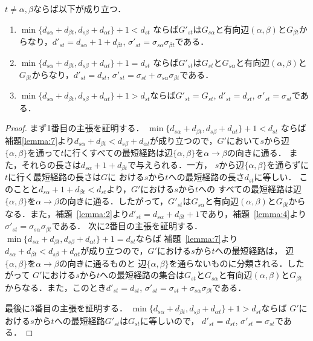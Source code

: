 \begin{lemma}
$t \neq \alpha, \beta$ならば以下が成り立つ．
\begin{enumerate}
\item $\min\{d_{s\alpha}+d_{\beta t}, d_{s\beta}+d_{\alpha t}\}+1<d_{st}$
ならば$G'_{st}$は$G_{s\alpha}$と有向辺$(\alpha,\beta)$と$G_{\beta t}$からなり，$d'_{st}=d_{s\alpha}+1+d_{\beta t}$, $\sigma'_{st}=\sigma_{s\alpha}\sigma_{\beta t}$である．
\item $\min\{d_{s\alpha}+d_{\beta t}, d_{s\beta}+d_{\alpha t}\}+1=d_{st}$
ならば$G'_{st}$は$G_{st}$と$G_{s\alpha}$と有向辺$(\alpha,\beta)$と$G_{\beta t}$からなり，$d'_{st}=d_{st}$, $\sigma'_{st}=\sigma_{st}+\sigma_{s\alpha}\sigma_{\beta t}$である．
\item $\min\{d_{s\alpha}+d_{\beta t}, d_{s\beta}+d_{\alpha t}\}+1>d_{st}$ならば$G'_{st}=G_{st}$, $d'_{st}=d_{st}$, $\sigma'_{st}=\sigma_{st}$である．
\end{enumerate}
\label{lemma:8}
\end{lemma}
\begin{proof}
まず1番目の主張を証明する．
$\min\{d_{s\alpha}+d_{\beta t}, d_{s\beta}+d_{\alpha t}\}+1<d_{st}$
ならば補題\ref{lemma:7}より$d_{s\alpha}+d_{\beta t}<d_{s\beta}+d_{\alpha t}$が成り立つので，$G'$において$s$から辺$\{\alpha,\beta\}$を通って$t$に行くすべての最短経路は辺$\{\alpha,\beta\}$を$\alpha \rightarrow \beta$の向きに通る．
また，それらの長さは$d_{s\alpha}+1+d_{\beta t}$で与えられる．一方，
$s$から辺$\{\alpha,\beta\}$を通らずに$t$に行く最短経路の長さは$G$に
おける$s$から$t$への最短経路の長さ$d_{st}$に等しい．
このことと$d_{s\alpha}+1+d_{\beta t}<d_{st}$より，$G'$における$s$から$t$への
すべての最短経路は辺$\{\alpha,\beta\}$を$\alpha \rightarrow \beta$の向きに通る．したがって，$G'_{st}$は$G_{s\alpha}$と有向辺$(\alpha,\beta)$と$G_{\beta t}$からなる．また，補題~\ref{lemma:2}より$d'_{st}=d_{s\alpha}+d_{\beta t}+1$であり，補題~\ref{lemma:4}より$\sigma'_{st}=\sigma_{s\alpha}\sigma_{\beta t}$である．
%
次に2番目の主張を証明する．
$\min\{d_{s\alpha}+d_{\beta t}, d_{s\beta}+d_{\alpha t}\}+1=d_{st}$ならば
補題~\ref{lemma:7}より$d_{s\alpha}+d_{\beta t}<d_{s\beta}+d_{\alpha t}$が成り立つので，$G'$における$s$から$t$への最短経路は，
辺$\{\alpha,\beta\}$を$\alpha \rightarrow \beta$の向きに通るものと
辺$\{\alpha,\beta\}$を通らないものに分類される．したがって
$G'$における$s$から$t$への最短経路の集合は$G_{st}$と$G_{s\alpha}$と有向辺$(\alpha,\beta)$と$G_{\beta t}$からなる．また，このとき$d'_{st}=d_{st}$, $\sigma'_{st}=\sigma_{st}+\sigma_{s\alpha}\sigma_{\beta t}$である．

最後に3番目の主張を証明する．
$\min\{d_{s\alpha}+d_{\beta t}, d_{s\beta}+d_{\alpha t}\}+1>d_{st}$ならば
$G'$における$s$から$t$への最短経路$G'_{st}$は$G_{st}$に等しいので，
$d'_{st}=d_{st}$, $\sigma'_{st}=\sigma_{st}$である．
\end{proof}


